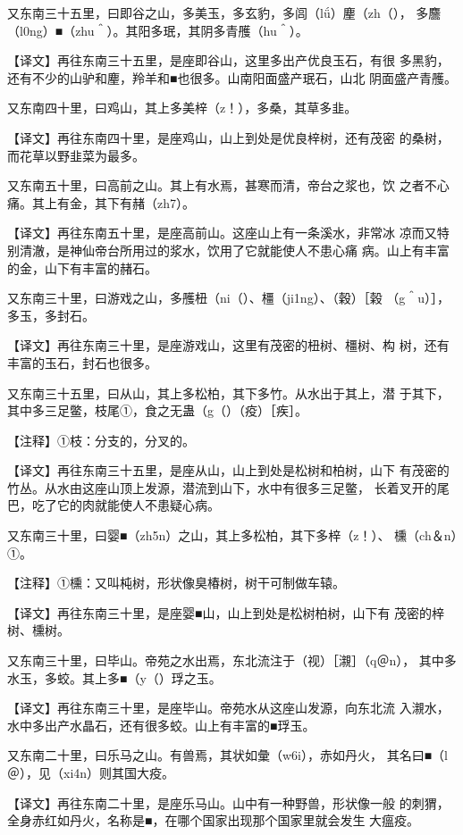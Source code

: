 \documentclass[a4paper,12pt,UTF8,twoside]{ctexbook}
\begin{document}
又东南三十五里，曰即谷之山，多美玉，多玄豹，多闾（lǘ）麈（zh（）， 多麢（l0ng）■（zhu＾）。其阳多珉，其阴多青雘（hu＾）。

【译文】再往东南三十五里，是座即谷山，这里多出产优良玉石，有很 多黑豹，还有不少的山驴和麈，羚羊和■也很多。山南阳面盛产珉石，山北 阴面盛产青雘。

又东南四十里，曰鸡山，其上多美梓（z！），多桑，其草多韭。

【译文】再往东南四十里，是座鸡山，山上到处是优良梓树，还有茂密 的桑树，而花草以野韭菜为最多。

又东南五十里，曰高前之山。其上有水焉，甚寒而清，帝台之浆也，饮 之者不心痛。其上有金，其下有赭（zh7）。

【译文】再往东南五十里，是座高前山。这座山上有一条溪水，非常冰 凉而又特别清澈，是神仙帝台所用过的浆水，饮用了它就能使人不患心痛 病。山上有丰富的金，山下有丰富的赭石。

又东南三十里，曰游戏之山，多雘杻（ni（）、橿（ji1ng）、（穀）［榖 （g＾u）］，多玉，多封石。

【译文】再往东南三十里，是座游戏山，这里有茂密的杻树、橿树、构 树，还有丰富的玉石，封石也很多。

又东南三十五里，曰从山，其上多松柏，其下多竹。从水出于其上，潜 于其下，其中多三足鳖，枝尾①，食之无蛊（g（）（疫）［疾］。

【注释】①枝：分支的，分叉的。

【译文】再往东南三十五里，是座从山，山上到处是松树和柏树，山下 有茂密的竹丛。从水由这座山顶上发源，潜流到山下，水中有很多三足鳖， 长着叉开的尾巴，吃了它的肉就能使人不患疑心病。

又东南三十里，曰婴■（zh5n）之山，其上多松柏，其下多梓（z！）、 櫄（ch＆n）①。

【注释】①櫄：又叫杶树，形状像臭椿树，树干可制做车辕。

【译文】再往东南三十里，是座婴■山，山上到处是松树柏树，山下有 茂密的梓树、櫄树。

又东南三十里，曰毕山。帝苑之水出焉，东北流注于（视）［瀙］（q＠n）， 其中多水玉，多蛟。其上多■（y（）琈之玉。

【译文】再往东南三十里，是座毕山。帝苑水从这座山发源，向东北流 入瀙水，水中多出产水晶石，还有很多蛟。山上有丰富的■琈玉。

又东南二十里，曰乐马之山。有兽焉，其状如彙（w6i），赤如丹火， 其名曰■（l＠），见（xi4n）则其国大疫。

【译文】再往东南二十里，是座乐马山。山中有一种野兽，形状像一般 的刺猬，全身赤红如丹火，名称是■，在哪个国家出现那个国家里就会发生 大瘟疫。
\end{document}
